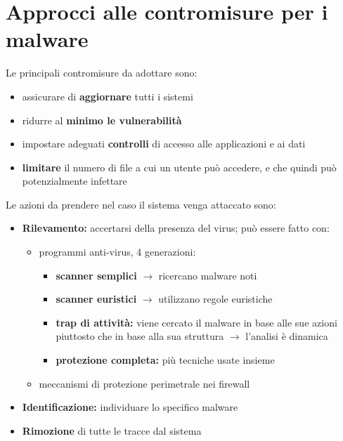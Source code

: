 \newpage
\section{Approcci alle contromisure per i malware}
Le principali contromisure da adottare sono:
\begin{itemize}
    \item assicurare di \textbf{aggiornare} tutti i sistemi
    \item ridurre al \textbf{minimo le vulnerabilità}
    \item impostare adeguati \textbf{controlli} di accesso alle applicazioni e ai dati 
    \item \textbf{limitare} il numero di file a cui un utente può accedere, e che quindi può 
    potenzialmente infettare
\end{itemize}

\noindent Le azioni da prendere nel caso il sistema venga attaccato sono:
\begin{itemize}
    \item \textbf{Rilevamento:} accertarsi della presenza del virus; può essere fatto con:
    \begin{itemize}
        \item programmi anti-virus, 4 generazioni:
        \begin{itemize}
            \item \textbf{scanner semplici} $\rightarrow$ ricercano malware noti 
            \item \textbf{scanner euristici} $\rightarrow$ utilizzano regole euristiche
            \item \textbf{trap di attività:} viene cercato il malware in base alle sue azioni piuttosto che in base alla sua 
            struttura $\rightarrow$ l'analisi è dinamica 
            \item \textbf{protezione completa:} più tecniche usate insieme 
        \end{itemize}
        \item meccanismi di protezione perimetrale nei firewall
    \end{itemize}
    \item \textbf{Identificazione:} individuare lo specifico malware
    \item \textbf{Rimozione} di tutte le tracce dal sistema
\end{itemize}









